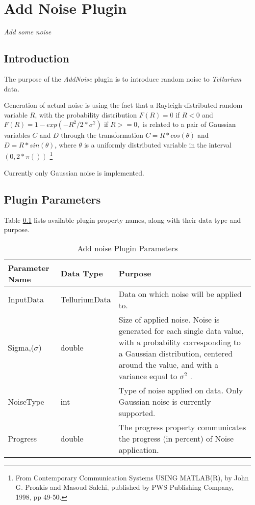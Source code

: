 \chapter*{Add Noise Plugin}
\setcounter{chapter}{1}
\emph{Add some noise}
\section{Introduction}
The purpose of the \emph{AddNoise} plugin is to introduce random noise to \emph{Tellurium} data.

Generation of actual noise is using the fact that a Rayleigh-distributed random variable $R$, with
the probability distribution $F(R) = 0$ if $R < 0$ and $F(R) = 1 - exp(-R^2/2*\sigma^2)$ if $R >= 0, $
is related to a pair of Gaussian variables $C$ and $D$ through the transformation $C = R * cos(\theta)$ and
$D = R * sin(\theta)$, where $\theta$ is a uniformly distributed variable
in the interval $(0, 2*\pi())$ \footnote{From Contemporary Communication Systems
USING MATLAB(R), by John G. Proakis and Masoud Salehi, published by
PWS Publishing Company, 1998, pp 49-50.}

Currently only Gaussian noise is implemented.

\section{Plugin Parameters}
Table \ref{table:AddNoisePluginParameters} lists available plugin property names, along with their data type and purpose.


\begin{table}[ht]
\centering %
\begin{tabular}{l l p{7.5cm}} %

Parameter Name & Data Type & Purpose \\ [0.5ex] %
\hline %
InputData         		& 	TelluriumData & Data on which noise will be applied to. \\
Sigma,($\sigma$)      	& 	double & Size of applied noise. Noise is generated for each single data value, with a probability corresponding to a Gaussian distribution, centered around the value, and with a variance equal to $\sigma^2$ .\\
NoiseType      	& 	int    & Type of noise applied on data. Only Gaussian noise is currently supported. \\
Progress     	& 	double  & The progress property communicates the progress (in percent) of Noise application. \\

\hline %
\end{tabular}
\caption{Add noise Plugin Parameters}
\label{table:AddNoisePluginParameters}
\end{table}


